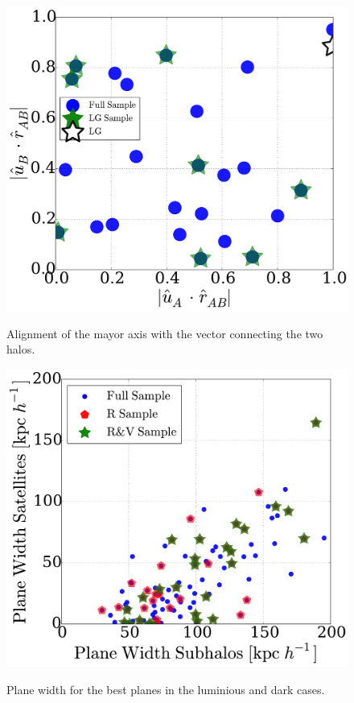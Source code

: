 \documentclass{emulateapj}
\begin{document}
\begin{figure}
\centering
\includegraphics[width=\hsize]{r_u_alignment.pdf}\\
\caption{Alignment of the mayor axis with the vector connecting the
  two halos.}
\label{fig:lg_alignment}
\end{figure}

\begin{figure}
\centering
\includegraphics[width=\hsize]{plane_width.pdf}\\
\caption{Plane width for the best planes in the luminious and dark cases.}
\label{fig:plane_width}
\end{figure}
\end{document}
